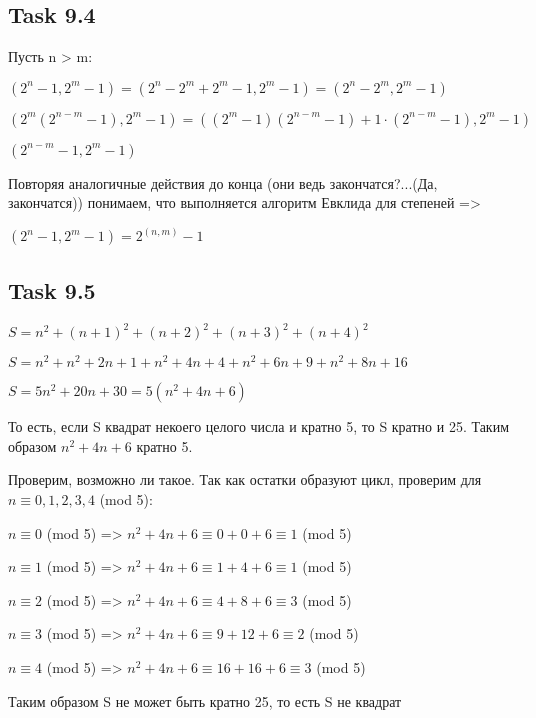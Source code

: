 \documentclass{article}
\begin{document}
        \subsection*{\huge Task 9.4}
        {\Large
            Пусть n > m:\par
            $(2^n - 1, 2^m - 1) = (2^n - 2^m + 2^m - 1, 2^m - 1) = (2^n - 2^m, 2^m - 1)$\par
            $(2^m(2^{n-m} - 1), 2^m - 1) = ((2^m - 1)(2^{n-m} - 1) + 1\cdot(2^{n-m}-1), 2^m - 1)$\par
            $(2^{n-m} - 1, 2^m - 1)$\par
            Повторяя аналогичные действия до конца (они ведь закончатся?...(Да, закончатся)) понимаем, что выполняется алгоритм Евклида для степеней =>\par
            $(2^n - 1, 2^m - 1) = 2^{(n,m)} - 1$
        }

        \subsection*{\huge Task 9.5}
        {\Large
            $S = n^2 + (n+1)^2 + (n + 2)^2 + (n+3)^2 + (n+4)^2$\par
            $S = n^2 + n^2 + 2n + 1 + n^2 + 4n + 4 + n^2 + 6n + 9 + n^2 + 8n + 16$\par
            $S = 5n^2 + 20n + 30 = 5(n^2 + 4n + 6)$\par
            То есть, если S квадрат некоего целого числа и кратно 5, то S кратно и 25. Таким образом $n^2 + 4n + 6$ кратно 5.\par
            Проверим, возможно ли такое. Так как остатки образуют цикл, проверим для $n \equiv 0, 1, 2, 3, 4$ (mod 5):\par
            $n \equiv 0$ (mod 5) => $n^2 + 4n + 6 \equiv 0 + 0 + 6 \equiv 1$ (mod 5)\par
            $n \equiv 1$ (mod 5) => $n^2 + 4n + 6 \equiv 1 + 4 + 6 \equiv 1$ (mod 5)\par
            $n \equiv 2$ (mod 5) => $n^2 + 4n + 6 \equiv 4 + 8 + 6 \equiv 3$ (mod 5)\par
            $n \equiv 3$ (mod 5) => $n^2 + 4n + 6 \equiv 9 + 12 + 6 \equiv 2$ (mod 5)\par
            $n \equiv 4$ (mod 5) => $n^2 + 4n + 6 \equiv 16 + 16 + 6 \equiv 3$ (mod 5)\par
            Таким образом S не может быть кратно 25, то есть S не квадрат
        }
\end{document}
